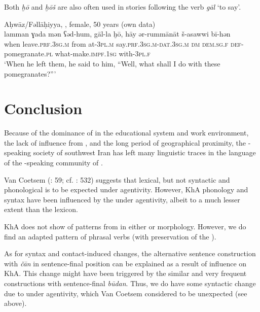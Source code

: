 \documentclass[output=paper,nonflat]{langsci/langscibook}
\begin{document}

Both \textit{ḫō} and \textit{ḫōš} are also often used in stories following the verb \textit{gāl} ‘to say’.

\ea
{Aḥwāz/Fəllāḥiyya, , female, 50 years (own data)}\\
\gll lamman ɣada mən ʕəd-hum, gāl-la ḫō, hāy ər-rummānāt š-asawwi bī-hən\\
     when leave.\textsc{prf}.\textsc{3sg.m} from at-\textsc{3pl.m} say.\textsc{prf}.\textsc{3sg.m}-\textsc{dat.3sg.m} \textsc{dm} \textsc{dem}.\textsc{sg}.\textsc{f} \textsc{def}-pomegranate.\textsc{pl} what-make.\textsc{impf}.\textsc{1sg} with-\textsc{3pl.f}\\
\glt ‘When he left them, he said to him, ``Well, what shall I do with these pomegranates?”’
\z

\section{Conclusion}

Because of the dominance of  in the  educational system and work environment, the lack of influence from  , and the long period of geographical proximity, the -speaking society of southwest Iran has left many linguistic traces in the language of the -speaking community of . 

Van Coetsem (\citeyear{VanCoetsem2000}: 59; cf. \citealt{Lucas2015}: 532) suggests that lexical, but not syntactic and phonological  is to be expected under  agentivity. However, KhA phonology and syntax have been influenced by the   under  agentivity, albeit to a much lesser extent than the lexicon.

KhA does not show  of patterns from  in either  or  morphology. However, we do find an adapted pattern  of  phrasal verbs (with preservation of the  ). 

As for syntax and contact-induced  changes, the alternative sentence construction with \textit{čān} in sentence-final position can be explained as a result of  influence on KhA. This change might have been triggered by the similar and very frequent  constructions with sentence-final \textit{būdan}. Thus, we do have some syntactic change due to  under  agentivity, which Van Coetsem considered to be unexpected (see above).
\end{document}
